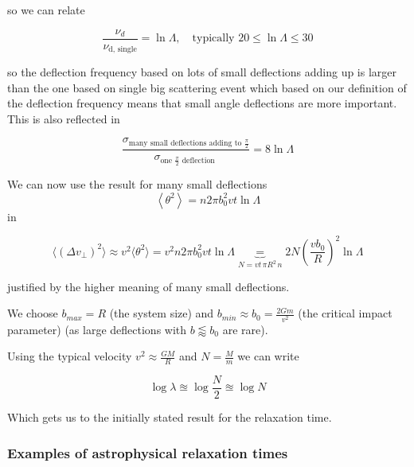 so we can relate

\begin{equation}
    \frac{\nu_d}{\nu_{\text{d, single}}} = {\ln \Lambda}, \quad \text{typically } 20 \leq \ln \Lambda \leq 30
\end{equation}

so \textcolor{blue1}{the deflection frequency based on lots of small deflections adding up is
larger than the one based on single big scattering event} which based on our definition of the
deflection frequency means that small angle deflections are more important. This is also reflected
in

\begin{equation}
    \frac{\sigma_{\text {many small deflections adding to } \frac{\pi}{2}}}{\sigma_{\text {one } \frac{\pi}{2} \text { deflection }}}=8 \ln \Lambda
\end{equation}

We can now use the result for many small deflections
\begin{equation}
    \left\langle\theta^2\right\rangle=n 2 \pi b_0^2 v t \ln \Lambda
\end{equation}
in

\begin{equation}
    \langle (\Delta v_\perp)^2 \rangle \approx v^2 \langle \theta^2 \rangle = v^2 n 2 \pi b_0^2 v t \ln \Lambda \underbrace{=}_{N = vt \, \pi R^2 \, n} 2N \left(\frac{vb_0}{R}\right)^2 \ln \Lambda
\end{equation}

justified by the higher meaning of many small deflections.

We choose $b_{max} = R$ (the system size) and $b_{min} \approx b_0 = \frac{2Gm}{v^2}$ (the critical impact parameter)
(as large deflections with $b \lessapprox b_0$ are rare).

Using the typical velocity $v^2 \approx \frac{GM}{R}$ and $N = \frac{M}{m}$ we can write

\begin{equation}
    \boxed{\log \lambda \approxeq \log \frac{N}{2} \approxeq \log N}
\end{equation}

Which gets us to the initially stated result for the relaxation time.

\subsubsection{Examples of astrophysical relaxation times}

